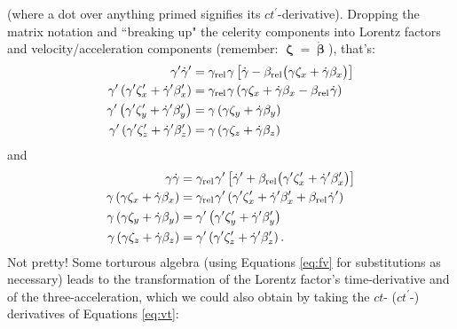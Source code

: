 \documentclass[12pt]{article}
\newcommand{\vvbeta}{\bm{\upbeta}}
\newcommand{\vvzeta}{\bm{\upzeta}}
\begin{document}
(where a dot over anything primed signifies its $ct^\prime$-derivative). Dropping the matrix notation and ``breaking up" the celerity components into Lorentz factors and velocity/acceleration components (remember: $\vvzeta = \dot{\vvbeta}$), that's:
\begin{equation*}
\begin{aligned}
\gamma^\prime \dot{\gamma}^\prime &= \gamma_{\textrm{rel}} \mkern1mu \gamma \left[ \dot{\gamma} - \beta_{\textrm{rel}} \bigl( \gamma \zeta_x + \dot{\gamma} \beta_x \bigr) \right] \\
\gamma^\prime \left( \gamma^{\prime} \zeta^{\prime}_x + \dot{\gamma}^\prime \beta_x^\prime \right) &= \gamma_{\textrm{rel}} \mkern1mu \gamma \left( \gamma \zeta_x + \dot{\gamma} \beta_x - \beta_{\textrm{rel}} \mkern1.mu \dot{\gamma} \right) \\
\gamma^\prime \left( \gamma^{\prime} \zeta^{\prime}_y + \dot{\gamma}^\prime \beta_y^\prime \right) &= \gamma \left( \gamma \zeta_y + \dot{\gamma} \beta_y \right) \\
\gamma^\prime \left( \gamma^{\prime} \zeta^{\prime}_z + \dot{\gamma}^\prime \beta_z^\prime \right) &= \gamma \left( \gamma \zeta_z +  \dot{\gamma} \beta_z \right)
\end{aligned}
\end{equation*}
and
\begin{equation*}
\begin{aligned}
\gamma \dot{\gamma} &= \gamma_{\textrm{rel}} \mkern1mu \gamma^\prime \left[ \dot{\gamma}^\prime + \beta_{\textrm{rel}} \bigl( \gamma^{\prime} \zeta^\prime_x +  \dot{\gamma}^\prime \beta^\prime_x \bigr) \right] \\
\gamma \left( \gamma \zeta_x + \dot{\gamma} \beta_x \right) &= \gamma_{\textrm{rel}} \mkern1mu \gamma^\prime \left( \gamma^{\prime} \zeta^\prime_x + \dot{\gamma}^\prime \beta^\prime_x + \beta_{\textrm{rel}} \mkern1.mu \dot{\gamma}^\prime \right) \\
\gamma \left( \gamma \zeta_y + \dot{\gamma} \beta_y \right) &= \gamma^\prime \left( \gamma^{\prime} \zeta^{\prime}_y + \dot{\gamma}^\prime \beta_y^\prime \right) \\
\gamma \left( \gamma \zeta_z +  \dot{\gamma} \beta_z \right) &= \gamma^\prime \left( \gamma^{\prime} \zeta^{\prime}_z + \dot{\gamma}^\prime \beta_z^\prime \right) .
\end{aligned}
\end{equation*}
Not pretty! Some torturous algebra (using Equations \ref{eq:fv} for substitutions as necessary) leads to the transformation of the Lorentz factor's time-derivative and of the three-acceleration, which we could also obtain by taking the $ct$- ($ct^\prime$-) derivatives of Equations \ref{eq:vt}:
\end{document}
